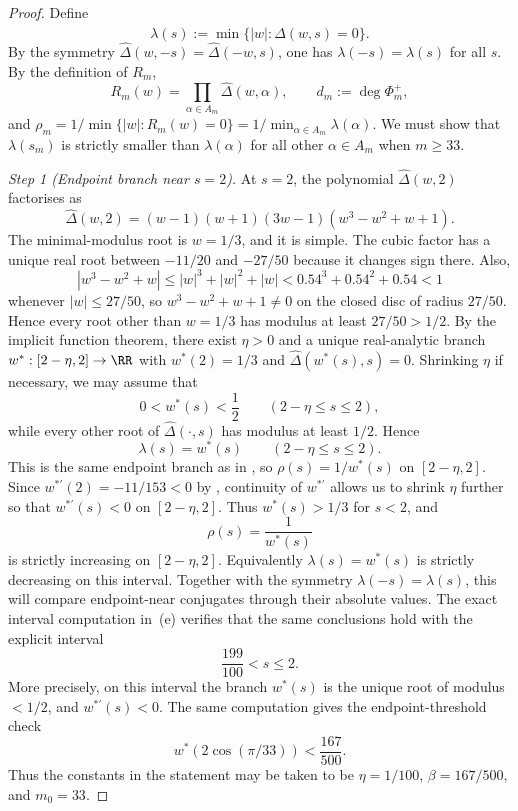 \begin{proof}

Define
\[
  \lambda(s):=\min\bigl\{|w|:\widehat\Delta(w,s)=0\bigr\}.
\]
By the symmetry \(\widehat\Delta(w,-s)=\widehat\Delta(-w,s)\), one has
\(\lambda(-s)=\lambda(s)\) for all \(s\). By the definition of \(R_m\),
\[
  R_m(w)=
    \prod_{\alpha\in A_m}\widehat\Delta(w,\alpha),
  \qquad d_m:=\deg\Phi_m^+,
\]
and \(\rho_m=1/\min\{|w|:R_m(w)=0\}=1/\min_{\alpha\in A_m}\lambda(\alpha)\).
We must show that \(\lambda(s_m)\) is strictly smaller than
\(\lambda(\alpha)\) for all other \(\alpha\in A_m\) when \(m\ge33\).

\medskip
\noindent\textit{Step 1 (Endpoint branch near \(s=2\)).}\quad
At \(s=2\), the polynomial \(\widehat\Delta(w,2)\) factorises as
\[
  \widehat\Delta(w,2)=(w-1)(w+1)(3w-1)(w^3-w^2+w+1).
\]
The minimal-modulus root is \(w=1/3\), and it is simple. The cubic
factor has a unique real root between \(-11/20\) and \(-27/50\) because
it changes sign there. Also,
\[
  |w^3-w^2+w|\le |w|^3+|w|^2+|w|<0.54^3+0.54^2+0.54<1
\]
whenever \(|w|\le 27/50\), so \(w^3-w^2+w+1\neq 0\) on the closed disc
of radius \(27/50\). Hence every root other than \(w=1/3\) has modulus
at least \(27/50>1/2\).
By the implicit function theorem, there exist \(\eta>0\) and a unique real-analytic branch
\(w^*:[2-\eta,2]\to\RR\) with \(w^*(2)=1/3\) and
\(\widehat\Delta(w^*(s),s)=0\). Shrinking \(\eta\) if necessary, we may
assume that
\[
  0<w^*(s)<\frac12
  \qquad (2-\eta\le s\le 2),
\]
while every other root of \(\widehat\Delta(\cdot,s)\) has modulus at
least \(1/2\). Hence
\[
  \lambda(s)=w^*(s)
  \qquad (2-\eta\le s\le 2).
\]
This is the same endpoint branch as in ,
so \(\rho(s)=1/w^*(s)\) on \([2-\eta,2]\).
Since \(w^{*\prime}(2)=-11/153<0\) by ,
continuity of \(w^{*\prime}\) allows us to shrink \(\eta\) further so
that \(w^{*\prime}(s)<0\) on \([2-\eta,2]\). Thus \(w^*(s)>1/3\) for
\(s<2\), and
\[
  \rho(s)=\frac{1}{w^*(s)}
\]
is strictly increasing on \([2-\eta,2]\).
Equivalently \(\lambda(s)=w^*(s)\) is strictly decreasing on this
interval. Together with the symmetry \(\lambda(-s)=\lambda(s)\), this
will compare endpoint-near conjugates through their absolute values.
The exact interval computation in
\,\textup{(e)} verifies that the same
conclusions hold with the explicit interval
\[
  \frac{199}{100}< s\le2.
\]
More precisely, on this interval the branch \(w^*(s)\) is the unique
root of modulus \(<1/2\), and \(w^{*\prime}(s)<0\). The same
computation gives the endpoint-threshold check
\[
  w^*(2\cos(\pi/33))<\frac{167}{500}.
\]
Thus the constants in the statement may be taken to be
\(\eta=1/100\), \(\beta=167/500\), and \(m_0=33\).


\end{proof}
